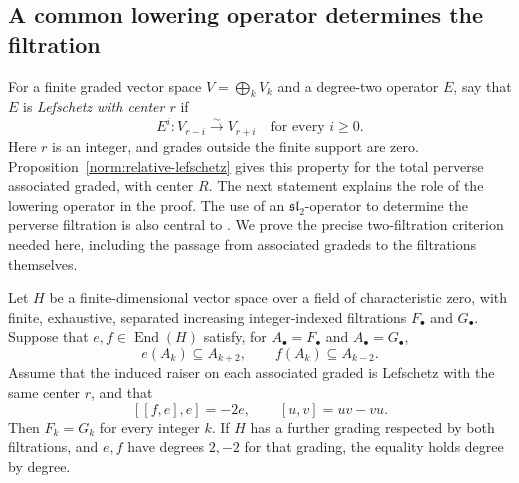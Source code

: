 \subsection{A common lowering operator determines the filtration}

For a finite graded vector space $V=\bigoplus_k V_k$ and a degree-two
operator $E$, say that $E$ is \emph{Lefschetz with center $r$} if
\[
 E^i:V_{r-i}\xrightarrow{\sim}V_{r+i}
 \quad\text{for every }i\ge0.
\]
Here $r$ is an integer, and grades outside the finite support are zero.
Proposition~\ref{norm:relative-lefschetz} gives this property for the
total perverse associated graded, with center $R$.  The next statement
explains the role of the lowering operator in the proof.
The use of an $\mathfrak{sl}_2$-operator to determine the perverse
filtration is also central to \cite[Propositions~7.9 and~8.2--8.3]{HMMS2025}.
We prove the precise two-filtration criterion needed here, including
the passage from associated gradeds to the filtrations themselves.

\begin{proposition}
\label{alg:comparison}
Let $H$ be a finite-dimensional vector space over a field of
characteristic zero, with finite, exhaustive, separated increasing
integer-indexed filtrations $F_\bullet$ and $G_\bullet$.
Suppose that $e,f\in\operatorname{End}(H)$ satisfy, for
$A_\bullet=F_\bullet$ and $A_\bullet=G_\bullet$,
\[
 e(A_k)\subseteq A_{k+2},\qquad f(A_k)\subseteq A_{k-2}.
\]
Assume that the induced raiser on each associated graded is Lefschetz
with the same center $r$, and that
\begin{equation}\label{alg:double-commutator}
 [[f,e],e]=-2e,
 \qquad [u,v]=uv-vu.
\end{equation}
Then $F_k=G_k$ for every integer $k$.
If $H$ has a further grading respected by both filtrations, and $e,f$
have degrees $2,-2$ for that grading, the equality holds degree by
degree.
\end{proposition}

